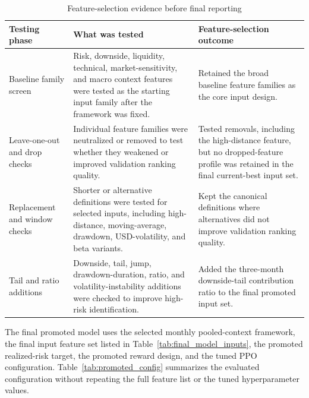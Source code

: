 \begin{table}[H]
\centering
\scriptsize
\caption{Feature-selection evidence before final reporting}
\label{tab:feature_selection_evidence}
\begin{tabularx}{\textwidth}{L{3.5cm}L{5.0cm}Y}
\toprule
Testing phase & What was tested & Feature-selection outcome \\
\midrule
Baseline family screen & Risk, downside, liquidity, technical, market-sensitivity, and macro context features were tested as the starting input family after the framework was fixed. & Retained the broad baseline feature families as the core input design. \\
Leave-one-out and drop checks & Individual feature families were neutralized or removed to test whether they weakened or improved validation ranking quality. & Tested removals, including the high-distance feature, but no dropped-feature profile was retained in the final current-best input set. \\
Replacement and window checks & Shorter or alternative definitions were tested for selected inputs, including high-distance, moving-average, drawdown, USD-volatility, and beta variants. & Kept the canonical definitions where alternatives did not improve validation ranking quality. \\
Tail and ratio additions & Downside, tail, jump, drawdown-duration, ratio, and volatility-instability additions were checked to improve high-risk identification. & Added the three-month downside-tail contribution ratio to the final promoted input set. \\
\bottomrule
\end{tabularx}
\end{table}

The final promoted model uses the selected monthly pooled-context framework, the final input feature set listed in Table~\ref{tab:final_model_inputs}, the promoted realized-risk target, the promoted reward design, and the tuned PPO configuration. Table~\ref{tab:promoted_config} summarizes the evaluated configuration without repeating the full feature list or the tuned hyperparameter values.

